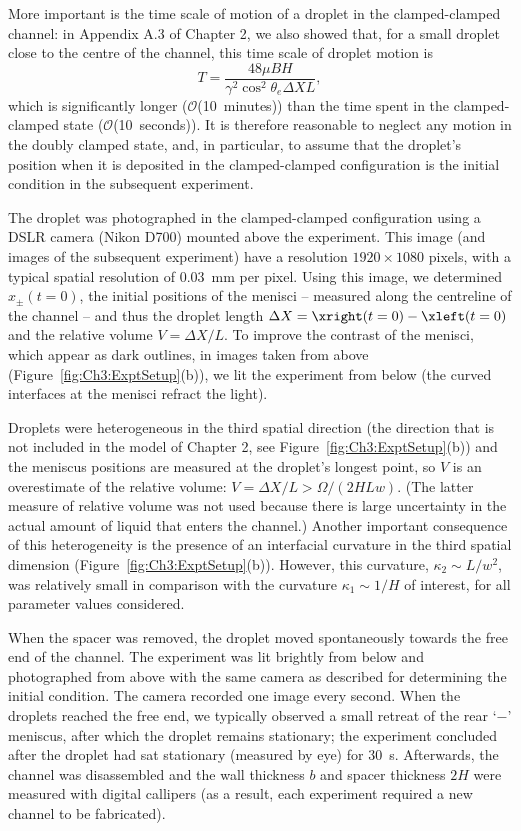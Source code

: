 More important is the time scale of motion of a droplet in the clamped-clamped channel: in Appendix A.3 of Chapter 2, we also showed that, for a small droplet close to the centre of the channel, this time scale of droplet motion is
\begin{equation}
T = \frac{48 \mu B H}{\gamma^2 \cos^2 \theta_e \Delta X L},
\end{equation}
which is significantly longer ($\mathcal{O}$(10~minutes)) than the time spent in the clamped-clamped state ($\mathcal{O}$(10~seconds)). It is therefore reasonable to neglect any motion in the doubly clamped state, and, in particular, to assume that the droplet's position when it is deposited in the clamped-clamped configuration is the initial condition in the subsequent experiment.

The droplet was photographed in the clamped-clamped configuration using a DSLR camera (Nikon D700) mounted above the experiment. This image (and images of the subsequent experiment) have a resolution $1920\times1080$ pixels, with a typical spatial resolution of $0.03$~mm per pixel. Using this image, we determined $x_{\pm}(t = 0)$, the initial positions of the menisci -- measured along the centreline of the channel -- and thus the droplet length $\Delta X = \xright(t = 0) - \xleft(t = 0)$ and the relative volume $V = \Delta X /L$. To improve the contrast of the menisci, which appear as dark outlines, in images taken from above (Figure~\ref{fig:Ch3:ExptSetup}(b)), we lit the experiment from below (the curved interfaces at the menisci refract the light).

Droplets were heterogeneous in the third spatial direction (the direction that is not included in the model of Chapter 2, see Figure~\ref{fig:Ch3:ExptSetup}(b)) and the meniscus positions are measured at the droplet's longest point, so $V$ is an overestimate of the relative volume: $V = \Delta X/L > \Omega/(2H Lw)$. (The latter measure of relative volume was not used because there is large uncertainty in the actual amount of liquid that enters the channel.) Another important consequence of this heterogeneity is the presence of an interfacial curvature in the third spatial dimension (Figure~\ref{fig:Ch3:ExptSetup}(b)). However, this curvature, $\kappa_2 \sim L/w^2$, was relatively small in comparison with the curvature $\kappa_1 \sim 1/H$ of interest, for all parameter values considered.

When the spacer was removed, the droplet moved spontaneously towards the free end of the channel. The experiment was lit brightly from below and photographed from above with the same camera as described for determining the initial condition. The camera recorded one image every second. When the droplets reached the free end, we typically observed a small retreat of the rear `$-$' meniscus, after which the droplet remains stationary; the experiment concluded after the droplet had sat stationary (measured by eye) for $30$~s. Afterwards, the channel was disassembled and the wall thickness $b$ and spacer thickness $2H$ were measured with digital callipers (as a result, each experiment required a new channel to be fabricated).

